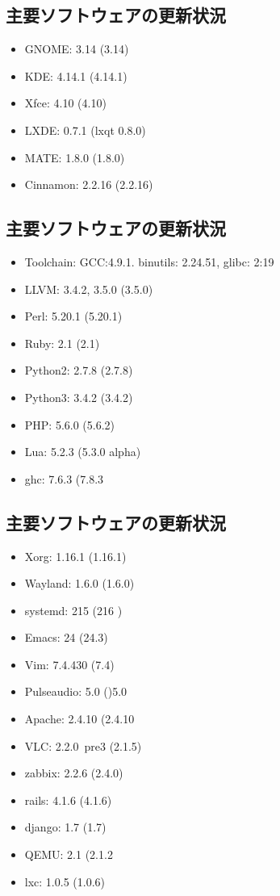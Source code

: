 \documentclass[mingoth,a4paper]{jsarticle}
\begin{document}
\subsection{主要ソフトウェアの更新状況}
\begin{itemize}
\item GNOME: 3.14 (3.14)
\item KDE: 4.14.1 (4.14.1)
\item Xfce: 4.10 (4.10)
\item LXDE: 0.7.1 (lxqt 0.8.0)
\item MATE: 1.8.0 (1.8.0)
\item Cinnamon: 2.2.16 (2.2.16)
\end{itemize}


\subsection{主要ソフトウェアの更新状況}
\begin{itemize}
\item Toolchain: GCC:4.9.1. binutils: 2.24.51, glibc: 2:19
\item LLVM: 3.4.2, 3.5.0 (3.5.0)
\item Perl: 5.20.1 (5.20.1)
\item Ruby: 2.1 (2.1)
\item Python2: 2.7.8 (2.7.8)
\item Python3: 3.4.2 (3.4.2)
\item PHP: 5.6.0 (5.6.2)
\item Lua: 5.2.3 (5.3.0 alpha)
\item ghc: 7.6.3 (7.8.3
\end{itemize}


\subsection{主要ソフトウェアの更新状況}
\begin{itemize}
\item Xorg: 1.16.1 (1.16.1)
\item Wayland: 1.6.0 (1.6.0)
\item systemd: 215 (216 )
\item Emacs: 24 (24.3)
\item Vim: 7.4.430 (7.4)
\item Pulseaudio: 5.0 ()5.0
\item Apache: 2.4.10 (2.4.10
\item VLC: 2.2.0~pre3 (2.1.5)
\item zabbix: 2.2.6 (2.4.0)
\item rails: 4.1.6 (4.1.6)
\item django: 1.7 (1.7)
\item QEMU: 2.1 (2.1.2
\item lxc: 1.0.5 (1.0.6)
\end{itemize}
\end{document}
